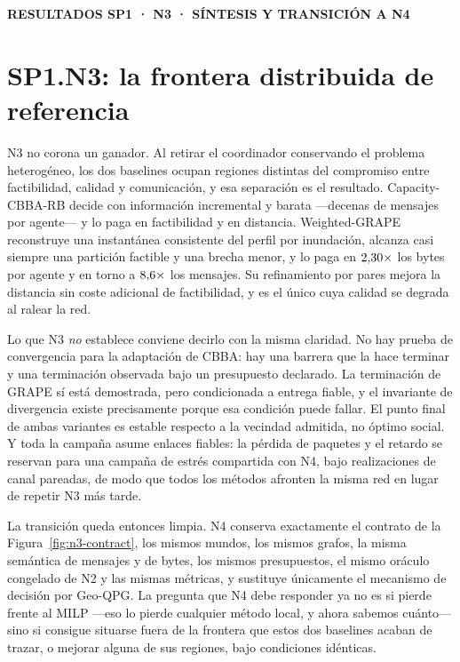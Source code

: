 \documentclass[12pt,a4paper]{article}
\newcommand{\leveltag}[1]{%
  \noindent\colorbox{VIUDark}{%
    \parbox{\dimexpr\textwidth-2\fboxsep\relax}{%
      \color{white}\sffamily\bfseries\small #1%
    }%
  }\par\smallskip
}
\begin{document}
\clearpage

\leveltag{RESULTADOS SP1 · N3 · SÍNTESIS Y TRANSICIÓN A N4}
\section*{SP1.N3: la frontera distribuida de referencia}

N3 no corona un ganador. Al retirar el coordinador conservando el problema
heterogéneo, los dos baselines ocupan regiones distintas del compromiso entre
factibilidad, calidad y comunicación, y esa separación es el resultado.
Capacity-CBBA-RB decide con información incremental y barata —decenas de mensajes
por agente— y lo paga en factibilidad y en distancia. Weighted-GRAPE reconstruye
una instantánea consistente del perfil por inundación, alcanza casi siempre una
partición factible y una brecha menor, y lo paga en $2{,}30\times$
los bytes por agente y en torno a $8{,}6\times$ los mensajes. Su refinamiento por pares mejora la distancia sin coste adicional
de factibilidad, y es el único cuya calidad se degrada al ralear la red.

Lo que N3 \emph{no} establece conviene decirlo con la misma claridad. No hay
prueba de convergencia para la adaptación de CBBA: hay una barrera que la hace
terminar y una terminación observada bajo un presupuesto declarado. La
terminación de GRAPE sí está demostrada, pero condicionada a entrega fiable, y el
invariante de divergencia existe precisamente porque esa condición puede fallar.
El punto final de ambas variantes es estable respecto a la vecindad admitida, no
óptimo social. Y toda la campaña asume enlaces fiables: la pérdida de paquetes y
el retardo se reservan para una campaña de estrés compartida con N4, bajo
realizaciones de canal pareadas, de modo que todos los métodos afronten la misma
red en lugar de repetir N3 más tarde.

La transición queda entonces limpia. N4 conserva exactamente el contrato de la
Figura~\ref{fig:n3-contract}, los mismos mundos, los mismos grafos, la misma
semántica de mensajes y de bytes, los mismos presupuestos, el mismo oráculo
congelado de N2 y las mismas métricas, y sustituye únicamente el mecanismo de
decisión por Geo-QPG. La pregunta que N4 debe responder ya no es si pierde frente
al MILP —eso lo pierde cualquier método local, y ahora sabemos cuánto— sino si
consigue situarse fuera de la frontera que estos dos baselines acaban de trazar,
o mejorar alguna de sus regiones, bajo condiciones idénticas.

\end{document}
